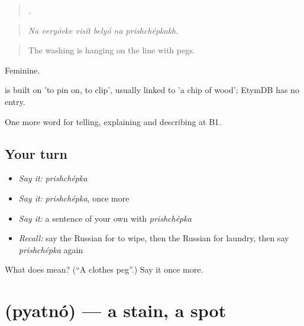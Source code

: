 \begin{quote}
     .
\end{quote}

\begin{quote}
\emph{Na veryóvke visít belyó na prishchépkakh.}
\end{quote}

\begin{quote}
The washing is hanging on the line with pegs.
\end{quote}

Feminine.

\begin{cousinweb}
\emph{} is built on \emph{} 'to pin on, to clip', usually linked to \emph{} 'a chip of wood'; EtymDB has no entry.
\end{cousinweb}

\begin{grammarlens}[title={What you've built}]
One more word for telling, explaining and describing at B1.
\end{grammarlens}

\subsection*{Your turn}
\begin{itemize}
\raggedright
  \item \emph{Say it:} \emph{prishchépka}
  \item \emph{Say it:} \emph{prishchépka}, once more
  \item \emph{Say it:} a sentence of your own with \emph{prishchépka}
  \item \emph{Recall:} say the Russian for to wipe, then the Russian for laundry, then say \emph{prishchépka} again
\end{itemize}

\begin{tcolorbox}[breakable,colback=teal!4,colframe=teal!35!black,title={Before you move on}]
What does  mean? (\textquotedblleft{}A clothes peg\textquotedblright{}.) Say it once more.
\end{tcolorbox}
\section[\texorpdfstring{\ru{пятно} (pyatnó)}{пятно (pyatnó)}]{ (pyatnó) — a stain, a spot}

\label{lesson:RU-C530-pyatno}



